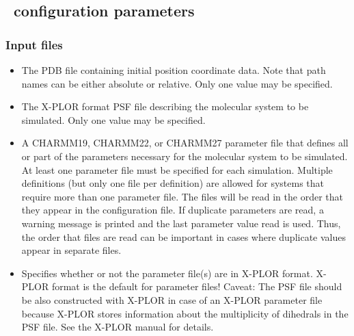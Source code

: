 \subsection{\NAMD\ configuration parameters}
\label{section:file_config}

\subsubsection{Input files}

\begin{itemize}
\item
{}
{\label{param:coordinates}
The PDB file containing initial position coordinate data.  
Note that path names can be either absolute or relative.  
Only one value may be specified.}

\item
{}
{\label{param:structure}
The X-PLOR format PSF file describing the molecular 
system to be simulated.  
Only one value may be specified.}

\item
{}
{\label{param:parameters}
A CHARMM19, CHARMM22, or CHARMM27 parameter file that defines all or part 
of the parameters necessary for the molecular system to be simulated.  
At least one parameter file must be specified for each simulation.  
Multiple definitions (but only one file per definition)
are allowed for systems that require more than one parameter file.
The files will be read 
in the order that they appear in the configuration file.  If duplicate
parameters are read, a warning message is printed and the last
parameter value read is used.  Thus, the order that files are read 
can be important in cases where duplicate values appear in 
separate files.}

\item
{}
{Specifies whether or not the parameter file(s) are in X-PLOR format.
 X-PLOR format is the default for parameter files!
 Caveat: The PSF file should be also constructed with X-PLOR in
 case of an X-PLOR parameter file because X-PLOR stores information
 about the multiplicity of dihedrals in the PSF file. See the X-PLOR
 manual for details.}


\end{itemize}
